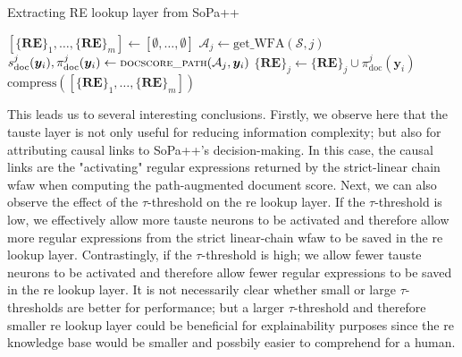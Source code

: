 \begin{algorithm}[t!]
  \small
  \caption{Extracting RE lookup layer from SoPa++}
  \label{algo:simplification_process}
  \begin{algorithmic}[1]
    \Statex
    \State $[\{\textbf{RE}\}_1, \ldots, \{\textbf{RE}\}_m] \gets [\emptyset,
    \ldots, \emptyset]$
    \State $\mathcal{A}_j \gets \text{get\_WFA}(\mathcal{S}, j)$
    \State $s^j_{\text{doc}}(\bm{y}_i), \pi^j_{\text{doc}}(\bm{y}_i) \gets
    {\small\textsc{docscore\_path}}(\mathcal{A}_j, \bm{y}_i)$
    \State $\{\textbf{RE}\}_j \gets \{\textbf{RE}\}_j \cup
    \pi^j_{\text{doc}}(\bm{y}_i)$
    \EndIf
    \EndFor
    \EndFor
    \State \Return $\text{compress}([\{\textbf{RE}\}_1, \ldots, \{\textbf{RE}\}_m])$
    \EndFunction
  \end{algorithmic}
\end{algorithm}

This leads us to several interesting conclusions. Firstly, we observe here that
the \ac{tauste} layer is not only useful for reducing information complexity; but
also for attributing causal links to SoPa++'s decision-making. In this case,
the causal links are the "activating" regular expressions returned by the
strict-linear chain \ac{wfaw} when computing the path-augmented document
score. Next, we can also observe the effect of the $\tau$-threshold on the \ac{re}
lookup layer. If the $\tau$-threshold is low, we effectively allow more \ac{tauste}
neurons to be activated and therefore allow more regular expressions from the
strict linear-chain \ac{wfaw} to be saved in the \ac{re} lookup layer.
Contrastingly, if the $\tau$-threshold is high; we allow fewer \ac{tauste} neurons to
be activated and therefore allow fewer regular expressions to be saved in the \ac{re}
lookup layer. It is not necessarily clear whether small or large
$\tau$-thresholds are better for performance; but a larger $\tau$-threshold and
therefore smaller \ac{re} lookup layer could be beneficial for explainability
purposes since the \ac{re} knowledge base would be smaller and possbily easier
to comprehend for a human. 

